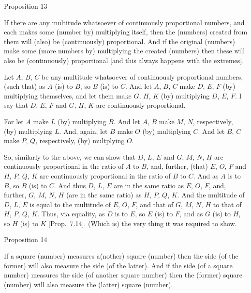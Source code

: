 \begin{center}
{\large Proposition 13}
\end{center}

If there are any multitude whatsoever of continuously proportional numbers, and each makes some (number by) multiplying itself, then the (numbers) created from them will
(also) be (continuously) proportional. And if the original (numbers) make some
(more numbers by) multiplying the created (numbers) then these will also be (continuously) proportional [and this always happens with the extremes].

Let $A$, $B$, $C$ be any multitude whatsoever of continuously proportional numbers, (such that) as $A$ (is) to $B$, so $B$ (is) to $C$. And
let $A$, $B$, $C$ make $D$, $E$, $F$ (by) multiplying themselves,
and let them make $G$, $H$, $K$ (by) multiplying $D$, $E$, $F$. 
I say that $D$, $E$, $F$ and $G$, $H$, $K$ are continuously proportional.

\epsfysize=2.2in
\centerline{}

For let $A$ make $L$ (by) multiplying $B$. And let  $A$, $B$
make  $M$, $N$, respectively, (by) multiplying $L$. And, again, let
$B$ make $O$ (by) multiplying $C$. And let  $B$, $C$
make  $P$, $Q$, respectively, (by) multplying $O$.

So, similarly to the above, we can show that $D$, $L$, $E$ and
$G$, $M$, $N$, $H$ are continuously proportional in the ratio of
$A$ to $B$, and, further, (that) $E$, $O$, $F$ and $H$, $P$, $Q$, $K$
are continuously proportional in the ratio of $B$ to $C$. And as $A$ is to $B$, so $B$ (is) to $C$. And thus $D$, $L$, $E$ are in the same ratio as
$E$, $O$, $F$, and, further, $G$, $M$, $N$, $H$ (are in the same ratio)
as $H$, $P$, $Q$, $K$. And the multitude of $D$, $L$, $E$ is equal
to the multitude of $E$, $O$, $F$, and that of $G$, $M$, $N$, $H$ to that of $H$, $P$, $Q$, $K$. Thus, via equality, as $D$ is to $E$, so $E$ (is) to $F$, and
as $G$ (is) to $H$, so $H$ (is) to $K$ [Prop.~7.14]. (Which is) the very thing it was required to show.


\begin{center}
{\large Proposition 14}
\end{center}

If a square (number) measures a(nother) square
(number) then the side (of the former) will also measure the
side (of the latter). And if the side (of a square number) measures the side
(of another square number) then the (former) square (number) will also
measure the (latter) square (number).

